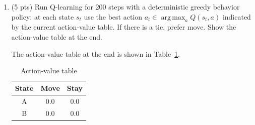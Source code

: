 \documentclass[a4paper]{article}
\theoremstyle{definition}
\DeclareMathOperator*{\argmax}{arg\,max}
\newenvironment{soln}{
    \leavevmode\color{blue}\ignorespaces
}{}
\begin{document}
\begin{enumerate}
\item (5 pts) Run Q-learning for 200 steps with a deterministic greedy behavior policy: at each state $s_t$ use the best action $a_t \in \argmax_a Q(s_t,a)$ indicated by the current action-value table. If there is a tie, prefer move. Show the action-value table at the end.
\begin{soln}
    The action-value table at the end is shown in Table~\ref{tab:q41}.
    \begin{table}[H]
        \centering
        \begin{tabular}{|c|c|c|}
            \hline
            State & Move & Stay\\
            \hline
            A & 0.0 & 0.0\\
            \hline
            B & 0.0 & 0.0\\
            \hline
        \end{tabular}
        \caption{Action-value table}
        \label{tab:q41}
    \end{table}
\end{soln}


\end{enumerate}
\end{document}
